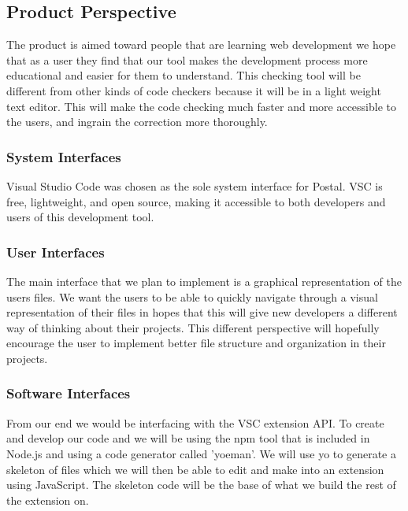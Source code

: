 \documentclass[letterpaper,10pt,titlepage,draftclsnofoot,onecolumn,onesided] {IEEEtran}
\begin{document}
\subsection{Product Perspective}
The product is aimed toward people that are learning web development we hope that as a user they find that our tool makes the development process more educational and easier for them to understand. 
This checking tool will be different from other kinds of code checkers because it will be in a light weight text editor.
This will make the code checking much faster and more accessible to the users, and ingrain the correction more thoroughly.

\subsubsection{System Interfaces}
Visual Studio Code was chosen as the sole system interface for Postal.
VSC is free, lightweight, and open source, making it accessible to both developers and users of this development tool.

\subsubsection{User Interfaces}
The main interface that we plan to implement is a graphical representation of the users files. 
We want the users to be able to quickly navigate through a visual representation of their files in hopes that this will give new developers a different way of thinking about their projects.
This different perspective will hopefully encourage the user to implement better file structure and organization in their projects.

\subsubsection{Software Interfaces}
From our end we would be interfacing with the VSC extension API. To create and develop our code and we will be using the npm tool that is included in Node.js and using a code generator called 'yoeman'. We will use yo to generate a skeleton of files which we will then be able to edit and make into an extension using JavaScript. The skeleton code will be the base of what we build the rest of the extension on. 
\end{document}
